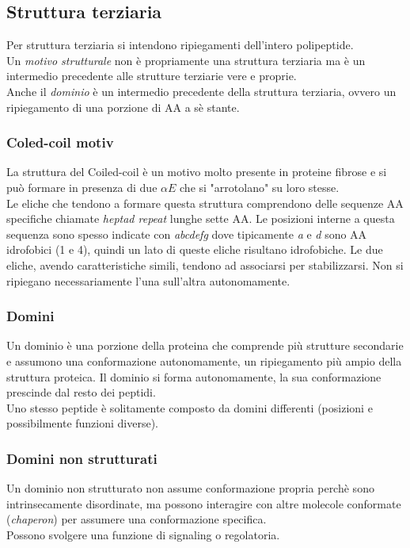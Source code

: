     \subsection{Struttura terziaria}
        Per struttura terziaria si intendono ripiegamenti dell'intero polipeptide.\\
        Un \textit{motivo strutturale} non è propriamente una struttura terziaria ma è un intermedio precedente alle strutture terziarie vere e proprie.\\
        Anche il \textit{dominio} è un intermedio precedente della struttura terziaria, ovvero un ripiegamento di una porzione di AA a sè stante.
        \subsubsection{Coled-coil motiv}
            La struttura del Coiled-coil è un motivo molto presente in proteine fibrose e si può formare in presenza di due $\alpha E$ che si "arrotolano" su loro stesse. \\
            Le eliche che tendono a formare questa struttura comprendono delle sequenze AA specifiche chiamate \textit{heptad repeat} lunghe sette AA. 
            Le posizioni interne a questa sequenza sono spesso indicate con \textit{abcdefg} dove tipicamente \textit{a} e \textit{d} sono AA idrofobici (1 e 4), quindi un lato di queste eliche risultano idrofobiche.
            Le due eliche, avendo caratteristiche simili, tendono ad associarsi per stabilizzarsi. Non si ripiegano necessariamente l'una sull'altra autonomamente.
        
        \subsubsection{Domini}
            Un dominio è una porzione della proteina che comprende più strutture secondarie e assumono una conformazione autonomamente, un ripiegamento più ampio della struttura proteica. Il dominio si forma autonomamente, la sua conformazione prescinde dal resto dei peptidi.\\
            Uno stesso peptide è solitamente composto da domini differenti (posizioni e possibilmente funzioni diverse).
        
        \subsubsection{Domini non strutturati}
            Un dominio non strutturato non assume conformazione propria perchè sono intrinsecamente disordinate, ma possono interagire con altre molecole conformate (\textit{chaperon}) per assumere una conformazione specifica.\\ 
            Possono svolgere una funzione di signaling o regolatoria.\\
            
